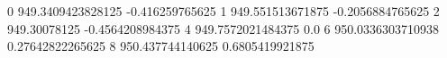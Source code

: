 0 949.3409423828125 -0.416259765625
1 949.551513671875 -0.2056884765625
2 949.30078125 -0.4564208984375
4 949.7572021484375 0.0
6 950.0336303710938 0.27642822265625
8 950.437744140625 0.6805419921875
